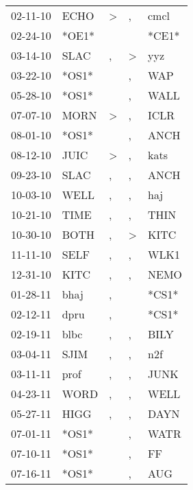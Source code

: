 \begin{supertabular}{lllll}
 02-11-10 &   ECHO &     \textgreater &                , &   cmcl \\
 02-24-10 &  *OE1* &                  &                  &  *CE1* \\
 03-14-10 &   SLAC &                , &     \textgreater &    yyz \\
 03-22-10 &  *OS1* &                  &                , &    WAP \\
 05-28-10 &  *OS1* &                  &                , &   WALL \\
 07-07-10 &   MORN &     \textgreater &                , &   ICLR \\
 08-01-10 &  *OS1* &                  &                , &   ANCH \\
 08-12-10 &   JUIC &     \textgreater &                , &   kats \\
 09-23-10 &   SLAC &                , &                , &   ANCH \\
 10-03-10 &   WELL &                , &                , &    haj \\
 10-21-10 &   TIME &                , &                , &   THIN \\
 10-30-10 &   BOTH &                , &     \textgreater &   KITC \\
 11-11-10 &   SELF &                , &                , &   WLK1 \\
 12-31-10 &   KITC &                , &                , &   NEMO \\
 01-28-11 &   bhaj &                , &                  &  *CS1* \\
 02-12-11 &   dpru &                , &                  &  *CS1* \\
 02-19-11 &   blbc &                , &                , &   BILY \\
 03-04-11 &   SJIM &                , &                , &    n2f \\
 03-11-11 &   prof &                , &                , &   JUNK \\
 04-23-11 &   WORD &                , &                , &   WELL \\
 05-27-11 &   HIGG &                , &                , &   DAYN \\
 07-01-11 &  *OS1* &                  &                , &   WATR \\
 07-10-11 &  *OS1* &                  &                , &     FF \\
 07-16-11 &  *OS1* &                  &                , &    AUG \\

\end{supertabular}
